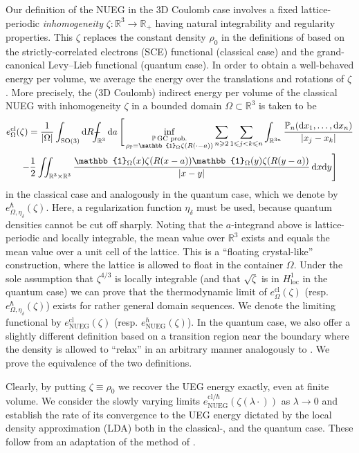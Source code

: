 \documentclass[final,onefignum,onetabnum,reqno]{amsart}
\theoremstyle{remark}
\renewcommand{\le}{\leqslant}
\renewcommand{\ge}{\geqslant}
\newcommand{\RR}{\mathbb{R}}
\newcommand{\PP}{\mathbb{P}}
\newcommand{\SO}{\mathrm{SO}}
\newcommand{\cl}{\mathrm{cl}} %
\newcommand{\NUEG}{\mathrm{NUEG}} %
\newcommand{\iden}{\mathbb{1}} %
\newcommand{\dd}{\mathrm{d}} %
\newcommand{\Hloc}{H_{\mathrm{loc}}} %
\def\Xint#1{\mathchoice
{\XXint\displaystyle\textstyle{#1}}%
{\XXint\textstyle\scriptstyle{#1}}%
{\XXint\scriptstyle\scriptscriptstyle{#1}}%
{\XXint\scriptscriptstyle\scriptscriptstyle{#1}}%
\!\int}
\def\XXint#1#2#3{{\setbox0=\hbox{$#1{#2#3}{\int}$ }
\vcenter{\hbox{$#2#3$ }}\kern-.6\wd0}}
\def\dashint{\Xint-}
\begin{document}
Our definition of the NUEG in the 3D Coulomb case involves a fixed lattice-periodic \emph{inhomogeneity} $\zeta:\RR^3\to\RR_+$ having natural integrability and regularity properties. 
This $\zeta$ replaces the constant density $\rho_0$ in the
definitions of \cite{lewin2018statistical} based on the strictly-correlated electrons (SCE) functional (classical case) and the grand-canonical Levy--Lieb functional \cite{lewin2019universal}
(quantum case). In order to obtain a well-behaved energy per volume, we average the energy over the translations and rotations of $\zeta$. More precisely,
the (3D Coulomb) indirect energy per volume of the classical NUEG with inhomogeneity $\zeta$ in a bounded domain $\Omega\subset\RR^3$ is taken to be
\begin{multline*}
e_\Omega^\cl(\zeta)=\frac{1}{|\Omega|}\int_{\SO(3)}\dd R \dashint_{\RR^3}\dd a\,\Bigg[ \inf_{\substack{\PP\,\text{GC prob.}\\\rho_\PP=\iden_\Omega \zeta(R(\cdot-a))}} 
\sum_{n\ge 2} \sum_{1\le j<k\le n} \int_{\RR^{3n}} \frac{\PP_n(\dd x_1,\ldots,\dd x_n)}{|x_j-x_k|}\\
-\frac{1}{2}\iint_{\RR^3\times\RR^3} \frac{\iden_\Omega(x) \zeta(R(x-a))\iden_\Omega(y) \zeta(R(y-a))}{|x-y|}\, \dd x\dd y \Bigg]
\end{multline*}
in the classical case and analogously in the quantum case, which we denote by $e_{\Omega,\eta_\delta}^\hbar(\zeta)$. Here, a regularization function $\eta_\delta$ must be used, because quantum densities cannot be cut off sharply.
 Noting that the $a$-integrand above is lattice-periodic and locally integrable, the mean value over $\RR^3$ exists and equals the mean value over 
a unit cell of the lattice. This is a ``floating crystal-like'' construction, where
the lattice is allowed to float in the container $\Omega$.
Under the sole assumption that $\zeta^{4/3}$ is locally integrable 
(and that $\sqrt{\zeta}$ is in $\Hloc^1$ in the quantum case) we can prove that the thermodynamic limit of $e_\Omega^\cl(\zeta)$ (resp. $e_{\Omega,\eta_\delta}^\hbar(\zeta)$)
exists for rather general domain sequences. We denote the limiting functional by $e_\NUEG^\cl(\zeta)$ (resp. $e_\NUEG^\hbar(\zeta)$). In the quantum case, we also offer a slightly different definition based on a transition region near the boundary where the density is allowed to ``relax'' in an arbitrary manner analogously to \cite{lewin2018statistical}. 
We prove the equivalence of the two definitions.

Clearly, by putting $\zeta\equiv\rho_0$ we recover the UEG energy exactly, even at finite volume. 
We consider the slowly varying limits $e_\NUEG^{\cl/\hbar}(\zeta(\lambda\cdot))$ as $\lambda\to 0$ and establish the rate of its convergence to the UEG energy 
dictated by the local density approximation (LDA)
both in the classical-, and the quantum case. These follow from an adaptation of the method of \cite{lewin2020local}. 
\end{document}
